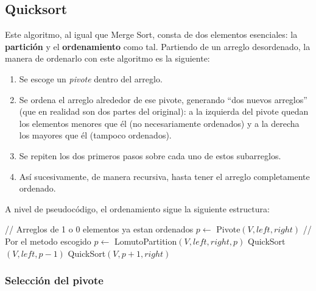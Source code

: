\subsection{Quicksort}\label{sec:quicksort}

Este algoritmo, al igual que Merge Sort, consta de dos elementos esenciales: la \textbf{partición} y el \textbf{ordenamiento} como tal. Partiendo de un arreglo desordenado, la manera de ordenarlo con este algoritmo es la siguiente:

\begin{enumerate}
    \item Se escoge un \textit{pivote} dentro del arreglo.
    \item Se ordena el arreglo alrededor de ese pivote, generando ``dos nuevos arreglos'' (que en realidad son dos partes del original): a la izquierda del pivote quedan los elementos menores que él (no necesariamente ordenados) y a la derecha los mayores que él (tampoco ordenados).
    \item Se repiten los dos primeros pasos sobre cada uno de estos subarreglos.
    \item Así sucesivamente, de manera recursiva, hasta tener el arreglo completamente ordenado.
\end{enumerate}

A nivel de pseudocódigo, el ordenamiento sigue la siguiente estructura:

\begin{algorithm}
    \caption{Quicksort $\triangleright$ $V[0..n-1]$}
    \begin{algorithmic}[1]
        \State \Return // Arreglos de 1 o 0 elementos ya estan ordenados
        \EndIf
        \State $p \gets$ Pivote$(V, left, right)$ // Por el metodo escogido
        \State $p \gets$ LomutoPartition$(V, left, right, p)$
        \State QuickSort$(V, left, p-1)$
        \State QuickSort$(V, p+1, right)$
        \EndProcedure
    \end{algorithmic}
\end{algorithm}

\subsubsection*{Selección del pivote}

